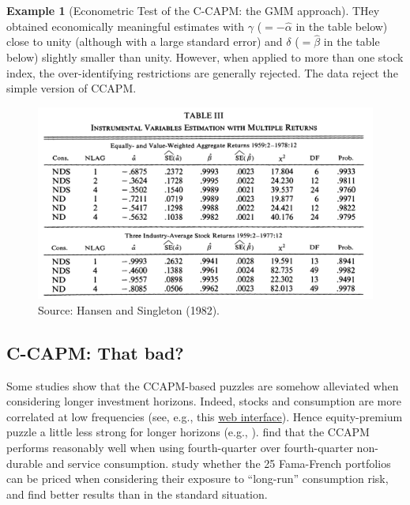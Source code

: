\documentclass[
  12pt,
]{book}
\theoremstyle{definition}
\theoremstyle{definition}
\newtheorem{example}{Example}[chapter]
\theoremstyle{definition}
\theoremstyle{definition}
\theoremstyle{remark}
\begin{document}
\begin{example}[Econometric Test of the C-CAPM: the GMM approach]
THey obtained economically meaningful estimates with \(\gamma\) (\(=-\hat\alpha\) in the table below) close to unity (although with a large standard error) and \(\delta\) (\(=\hat\beta\) in the table below) slightly smaller than unity. However, when applied to more than one stock index, the over-identifying restrictions are generally rejected. The data reject the simple version of CCAPM.

\begin{figure}

{\centering \includegraphics[width=1\linewidth]{figures/tableHansenSingleton82A} 

}

\caption{Source: Hansen and Singleton (1982).}\label{fig:HansenSinfgleton1982}
\end{figure}

\end{example}

\hypertarget{c-capm-that-bad}{%
\subsection{C-CAPM: That bad?}\label{c-capm-that-bad}}

Some studies show that the CCAPM-based puzzles are somehow alleviated when considering longer investment horizons. Indeed, stocks and consumption are more correlated at low frequencies (see, e.g., this \href{https://jrenne.shinyapps.io/APModels}{web interface}). Hence equity-premium puzzle a little less strong for longer horizons (e.g., \citet{DANIEL_MARSHALL_1997}). \citet{Jagannathan_Wang_2007} find that the CCAPM performs reasonably well when using fourth-quarter over fourth-quarter non-durable and service consumption. \citet{Parker_Julliard_2005} study whether the 25 Fama-French portfolios can be priced when considering their exposure to ``long-run'' consumption risk, and find better results than in the standard situation.
\end{document}

